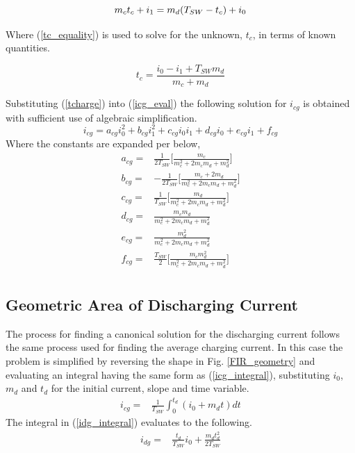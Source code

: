 \documentclass[conference]{IEEEtran}
\begin{document}
\begin{equation}
m_ct_c+i_1 = m_d(T_{SW} - t_c)+i_0\\ \label{tc_equality}
\end{equation}

Where (\ref{tc_equality}) is used to solve for the unknown, $t_c$, in terms of known quantities.

\begin{equation}
t_c = \frac{i_0-i_1+T_{SW}m_d}{m_c+m_d} \label{tcharge}
\end{equation}	

Substituting (\ref{tcharge}) into (\ref{icg_eval}) the following solution for \(i_{cg}\) is obtained with sufficient use of algebraic simplification.
\begin{equation}
i_{cg} = a_{cg}i_0^2+b_{cg}i_1^2+c_{cg}i_0i_1+d_{cg}i_0+e_{cg}i_1+f_{cg} \label{i_cg_canon}
\end{equation}
Where the constants are expanded per below,
\begin{align*}
a_{cg} = & \frac{1}{2T_{SW}} \bigg[ \frac{m_c}{m_c^2+2m_cm_d+m_d^2} \bigg]\nonumber\\
b_{cg} = & -\frac{1}{2T_{SW}} \bigg[ \frac{m_c + 2m_d}{m_c^2+2m_cm_d+m_d^2} \bigg]\nonumber\\
c_{cg} = & \frac{1}{T_{SW}} \bigg[  \frac{m_d}{m_c^2+2m_cm_d+m_d^2} \bigg] \nonumber\\
d_{cg} = & \frac{m_cm_d}{m_c^2+2m_cm_d+m_d^2}\nonumber\\
e_{cg} = & \frac{m_d^2}{m_c^2+2m_cm_d+m_d^2}\nonumber\\
f_{cg} = & \frac{T_{SW}}{2} \bigg[ \frac{m_c m_d^2}{m_c^2+2m_cm_d+m_d^2} \bigg]\nonumber\\
\end{align*}

\subsection{Geometric Area of Discharging Current}
The process for finding a canonical solution for the discharging current follows the same process used for finding the average charging current. In this case the problem is simplified by reversing the shape in Fig. \ref{FIR_geometry} and evaluating an integral having the same form as (\ref{icg_integral}), substituting $i_0$, $m_d$ and $t_d$ for the initial current, slope and time variable.
\begin{align}
i_{cg} = & \frac{1}{T_{SW}}\int_0^{t_d}(i_0 + m_d t)dt \label{idg_integral}
\end{align}
The integral in (\ref{idg_integral}) evaluates to the following.
\begin{align}
i_{dg} = & \frac{t_d}{T_{SW}} i_0 + \frac{m_dt_d^2}{2T_{SW}}
\label{idg_integral_eval}
\end{align}
\end{document}
